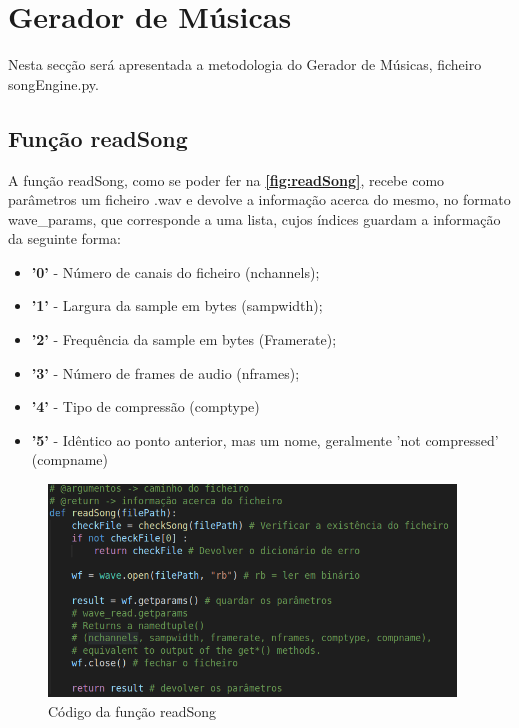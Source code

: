 \documentclass{report}
\begin{document}
\section{Gerador de Músicas}
\label{sec:songEngine}
Nesta secção será apresentada a metodologia do Gerador de Músicas, ficheiro songEngine.py.

\subsection{Função readSong}
\label{ssec:readSong}
A função readSong, como se poder fer na \textbf{\autoref{fig:readSong}}, recebe como parâmetros um ficheiro 
.wav e devolve a informação acerca do mesmo, no formato wave\_params, 
que corresponde a uma lista, cujos índices guardam a informação da seguinte forma:
\begin{itemize}
    \item \textbf{'0'} - Número de canais do ficheiro (nchannels);
    \item \textbf{'1'} - Largura da sample em bytes (sampwidth);
    \item \textbf{'2'} - Frequência da sample em bytes (Framerate);
    \item \textbf{'3'} - Número de frames de audio (nframes);
    \item \textbf{'4'} - Tipo de compressão (comptype)
    \item \textbf{'5'} - Idêntico ao ponto anterior, mas um nome, geralmente 'not compressed' (compname)
\end{itemize}

\begin{figure}[!h]
\center 
\includegraphics[height=160pt]{img/readSong.png}
\caption{Código da função readSong}
\label{fig:readSong}
\end{figure}
\end{document}
